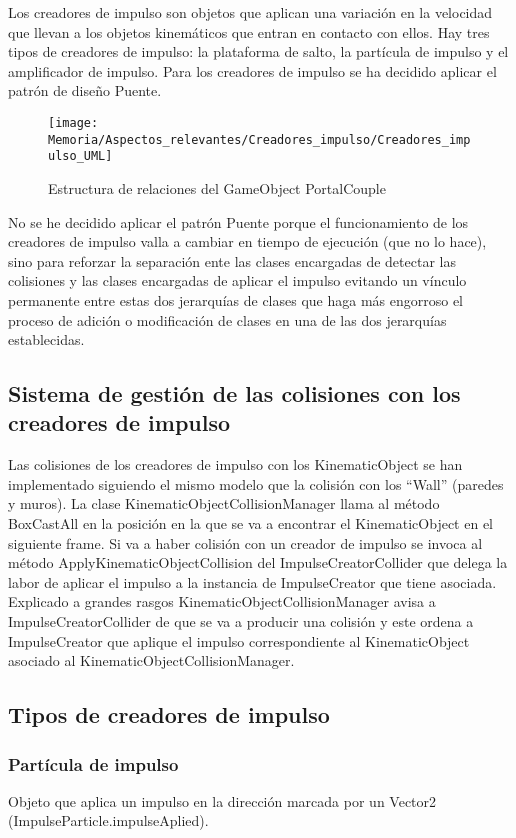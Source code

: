 Los creadores de impulso son objetos que aplican una variación en la velocidad que llevan a los objetos kinemáticos que entran en contacto con ellos. Hay tres tipos de creadores de impulso: la plataforma de salto, la partícula de impulso y el amplificador de impulso.
Para los creadores de impulso se ha decidido aplicar el patrón de diseño Puente.
\clearpage

\begin{figure}[h]
\texttt{[image: Memoria/Aspectos\_relevantes/Creadores\_impulso/Creadores\_impulso\_UML]}
\caption{Estructura de relaciones del GameObject PortalCouple}
\end{figure}

No se he decidido aplicar el patrón Puente porque el funcionamiento de los creadores de impulso valla a cambiar en tiempo de ejecución (que no lo hace), sino para reforzar la separación ente las clases encargadas de detectar las colisiones y las clases encargadas de aplicar el impulso evitando un vínculo permanente entre estas dos jerarquías de clases que haga más engorroso el proceso de adición o modificación de clases en una de las dos jerarquías establecidas.

\subsection{Sistema de gestión de las colisiones con los creadores de impulso}
Las colisiones de los creadores de impulso con los KinematicObject se han implementado siguiendo el mismo modelo que la colisión con los “Wall” (paredes y muros). La clase KinematicObjectCollisionManager llama al método BoxCastAll en la posición en la que se va a encontrar el KinematicObject en el siguiente frame. Si va a haber colisión con un creador de impulso se invoca al método ApplyKinematicObjectCollision del ImpulseCreatorCollider que delega la labor de aplicar el impulso a la instancia de ImpulseCreator que tiene asociada.\\
Explicado a grandes rasgos KinematicObjectCollisionManager avisa a ImpulseCreatorCollider de que se va a producir una colisión y este ordena a ImpulseCreator que aplique el impulso correspondiente al KinematicObject asociado al KinematicObjectCollisionManager.

\subsection{Tipos de creadores de impulso}
\subsubsection{Partícula de impulso}
Objeto que aplica un impulso en la dirección marcada por un Vector2 (ImpulseParticle.impulseAplied).

